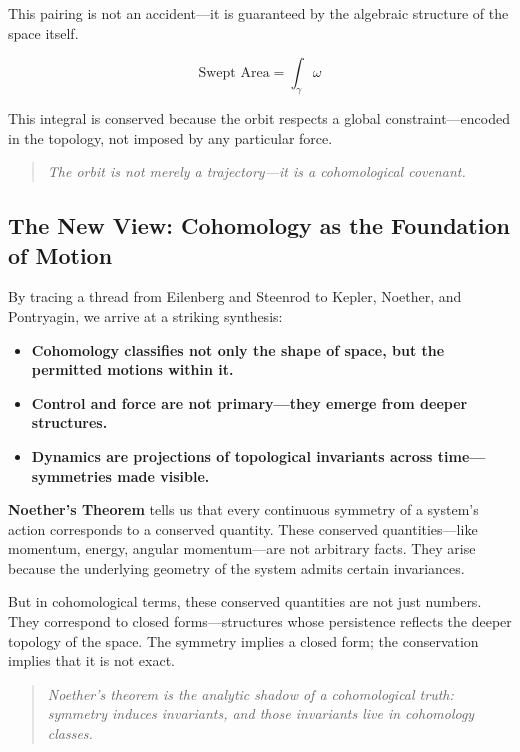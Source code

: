 This pairing is not an accident—it is guaranteed by the algebraic structure of the space itself.

\[
\text{Swept Area} = \int_{\gamma} \omega
\]

This integral is conserved because the orbit respects a global constraint—encoded in the topology, not imposed by any particular force.

\begin{quote}
\textit{The orbit is not merely a trajectory—it is a cohomological covenant.}
\end{quote}

\subsection{The New View: Cohomology as the Foundation of Motion}

By tracing a thread from Eilenberg and Steenrod to Kepler, Noether, and Pontryagin, we arrive at a striking synthesis:

\begin{itemize}
    \item \textbf{Cohomology classifies not only the shape of space, but the permitted motions within it.}
    \item \textbf{Control and force are not primary—they emerge from deeper structures.}
    \item \textbf{Dynamics are projections of topological invariants across time—symmetries made visible.}
\end{itemize}

\medskip

\noindent
\textbf{Noether’s Theorem} tells us that every continuous symmetry of a system’s action corresponds to a conserved quantity. These conserved quantities—like momentum, energy, angular momentum—are not arbitrary facts. They arise because the underlying geometry of the system admits certain invariances.

\medskip

But in cohomological terms, these conserved quantities are not just numbers. They correspond to closed forms—structures whose persistence reflects the deeper topology of the space. The symmetry implies a closed form; the conservation implies that it is not exact.

\begin{quote}
\textit{Noether’s theorem is the analytic shadow of a cohomological truth:  
symmetry induces invariants, and those invariants live in cohomology classes.}
\end{quote}

